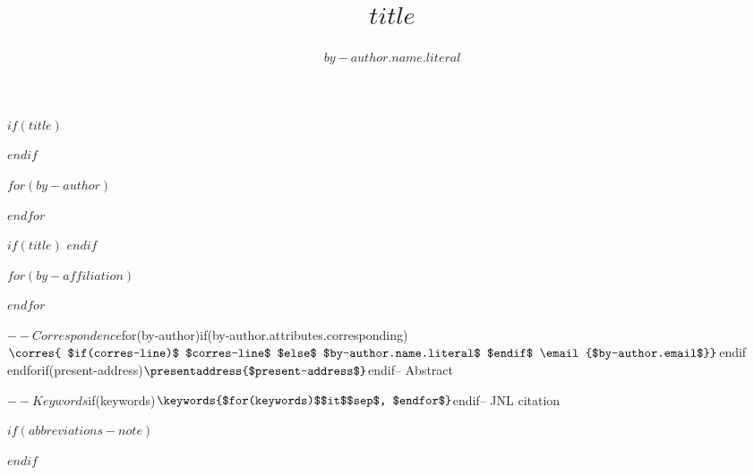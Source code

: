 $if(title)$
\title{$title$}
$endif$

$for(by-author)$
\author[$for(by-author.affiliations)$$it.number$$sep$,$endfor$]{$by-author.name.literal$}
$endfor$

$if(title)$
$endif$

$for(by-affiliation)$
\address[$it.number$]{%
}
$endfor$

$-- Correspondence
$for(by-author)$
$if(by-author.attributes.corresponding)$
\corres{
$if(corres-line)$
$corres-line$
$else$
$by-author.name.literal$
$endif$
\email{$by-author.email$}}$endif$
$endfor$
$if(present-address)$
\presentaddress{$present-address$}
$endif$


$-- Abstract

$-- Keywords
$if(keywords)$
\keywords{$for(keywords)$$it$$sep$, $endfor$}
$endif$

$-- JNL citation

\maketitle

$if(abbreviations-note)$
\renewcommand\thefootnote{}

\renewcommand\thefootnote{\fnsymbol{footnote}}
\setcounter{footnote}{1}
$endif$
